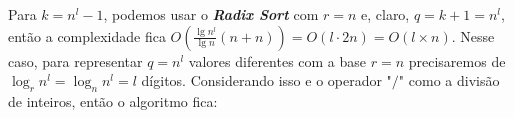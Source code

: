 Para $k = n^l - 1$, podemos usar o \textbf{\textit{Radix Sort}} com $r = n$ e, claro, $q = k + 1 = n^l$, então a complexidade fica
$O\left(\frac{\lg n^l}{\lg n}(n + n)\right) = O(l \cdot 2n) = O(l \times n)$. Nesse caso, para representar $q = n^l$ valores diferentes com a
base $r = n$ precisaremos de $\log_r n^l = \log_n n^l = l$ dígitos. Considerando isso e o operador "$/$"  como a divisão de inteiros, então o algoritmo fica:
